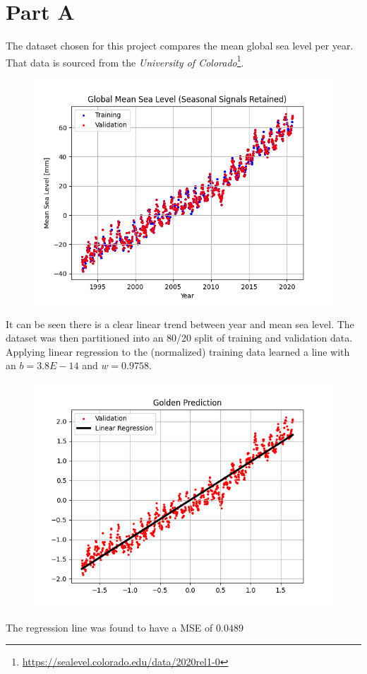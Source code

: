 \newpage
\section{Part A}
\label{sec:sec_a}
The dataset chosen for this project compares the mean global sea level per year. That data is sourced from the \textit{University of Colorado}\footnote{\url{https://sealevel.colorado.edu/data/2020rel1-0}}.


\begin{figure}[htpb]
	\centering
	\includegraphics[width=\columnwidth]{figures/dataset.png}
	\label{fig:dataset}
\end{figure}

It can be seen there is a clear linear trend between year and mean sea level. The dataset was then partitioned into an 80/20 split of training and validation data. Applying linear regression to the (normalized) training data learned a line with an $b=3.8E-14$ and $w=0.9758$.


\begin{figure}[htpb]
	\centering
	\includegraphics[width=\columnwidth]{figures/linear_regression.png}
	\label{fig:linear_regression}
\end{figure}

The regression line was found to have a MSE of $0.0489$